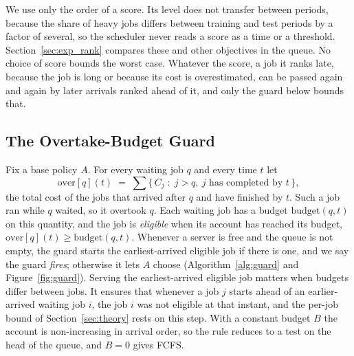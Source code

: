 We use only the order of a score. Its level does not transfer between periods, because the
share of heavy jobs differs between training and test periods by a factor of several, so
the scheduler never reads a score as a time or a threshold. Section~\ref{sec:exp_rank}
compares these and other objectives in the queue. No choice of score bounds the worst case.
Whatever the score, a job it ranks late, because the job is long or because its cost is
overestimated, can be passed again and again by later arrivals ranked ahead of it, and only
the guard below bounds that.

\subsection{The Overtake-Budget Guard}
\label{sec:guard}

Fix a base policy $A$. For every waiting job $q$ and every time $t$ let
\begin{equation}
  \mathrm{over}[q](t) \;=\;
  \sum \{\, C_j \;:\; j > q,\ j \text{ has completed by } t \,\},
  \label{eq:over}
\end{equation}
the total cost of the jobs that arrived after $q$ and have finished by $t$. Such a job ran
while $q$ waited, so it overtook $q$. Each waiting job has a budget $\mathrm{budget}(q,t)$
on this quantity, and the job is \emph{eligible} when its account has reached its budget,
$\mathrm{over}[q](t) \ge \mathrm{budget}(q,t)$. Whenever a server is free and the queue is
not empty, the guard starts the earliest-arrived eligible job if there is one, and we
say the guard \emph{fires}; otherwise it lets $A$ choose (Algorithm~\ref{alg:guard} and Figure~\ref{fig:guard}). Serving
the earliest-arrived eligible job matters when budgets differ between jobs. It ensures that
whenever a job $j$ starts ahead of an earlier-arrived waiting job $i$, the job $i$ was not
eligible at that instant, and the per-job bound of Section~\ref{sec:theory} rests on this
step. With a constant budget $B$ the account is non-increasing in arrival order, so the
rule reduces to a test on the head of the queue, and $B = 0$ gives FCFS.

